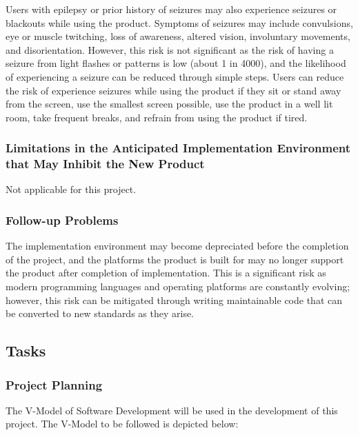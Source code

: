 \documentclass[12pt, titlepage]{article}
\begin{document}
Users with epilepsy or prior history of seizures may also experience seizures or 
blackouts while using the product. Symptoms of seizures may include convulsions, 
eye or muscle twitching, loss of awareness, altered vision, involuntary 
movements, and disorientation. However, this risk is not significant as the risk 
of having a seizure from light flashes or patterns is low (about 1 in 4000), and 
the likelihood of experiencing a seizure can be reduced through simple steps. 
Users can reduce the risk of experience seizures while using the product if they 
sit or stand away from the screen, use the smallest screen possible, use the 
product in a well lit room, take frequent breaks, and refrain from using the 
product if tired.

\subsubsection{Limitations in the Anticipated Implementation Environment that 
May Inhibit the New Product}
Not applicable for this project.

\subsubsection{Follow-up Problems}
The implementation environment may become depreciated before the completion of 
the project, and the platforms the product is built for may no longer support 
the product after completion of implementation. This is a significant risk as 
modern programming languages and operating platforms are constantly evolving; 
however, this risk can be mitigated through writing maintainable code that can 
be converted to new standards as they arise.

\subsection{Tasks}
\subsubsection{Project Planning}
The V-Model of Software Development will be used in the development of this 
project. The V-Model to be followed is depicted below:
\end{document}
